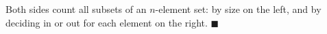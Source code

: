Both sides count all subsets of an $n$-element set: by size on the left, and by deciding in or out for each element on the right. $\blacksquare$
